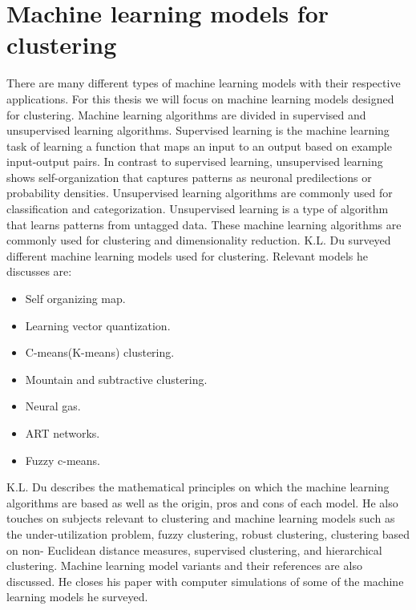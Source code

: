 \documentclass[../main]{subfiles}
\begin{document}
\section{Machine learning models for clustering}
\label{ch:neuralNetworkSurvey}
There are many different types of machine learning models with their respective applications.
For this thesis we will focus on machine learning models designed for clustering.
\newline
Machine learning algorithms are divided in supervised and unsupervised learning algorithms\cite{supervisedUnsupervised}.
Supervised learning is the machine learning task of learning a function that maps an input to an output based on example input-output pairs\cite{supervisedUnsupervised}.
In contrast to supervised learning, unsupervised learning shows self-organization that captures patterns as neuronal predilections or probability densities\cite{supervisedUnsupervised}.
Unsupervised learning algorithms are commonly used for classification and categorization\cite{supervisedUnsupervised}.
Unsupervised learning is a type of algorithm that learns patterns from untagged data\cite{supervisedUnsupervised}.
These machine learning algorithms are commonly used for clustering and dimensionality reduction\cite{supervisedUnsupervised}.
\newline
K.L. Du surveyed different machine learning models used for clustering\cite{Du2010Clustering:Approach}.
Relevant models he discusses are:
\begin{itemize}
    \item Self organizing map.
    \item Learning vector quantization.
    \item C-means(K-means) clustering.
    \item Mountain and subtractive clustering.
    \item Neural gas.
    \item ART networks.
    \item Fuzzy c-means.
\end{itemize}
K.L. Du describes the mathematical principles on which the machine learning algorithms are based as well as the origin, pros and cons of each model.
\newline
He also touches on subjects relevant to clustering and machine learning models such as the under-utilization problem, fuzzy clustering, robust clustering, clustering based on non- Euclidean distance measures, supervised clustering, and hierarchical clustering.
Machine learning model variants and their references are also discussed.
\newline
He closes his paper with computer simulations of some of the machine learning models he surveyed.
\end{document}
